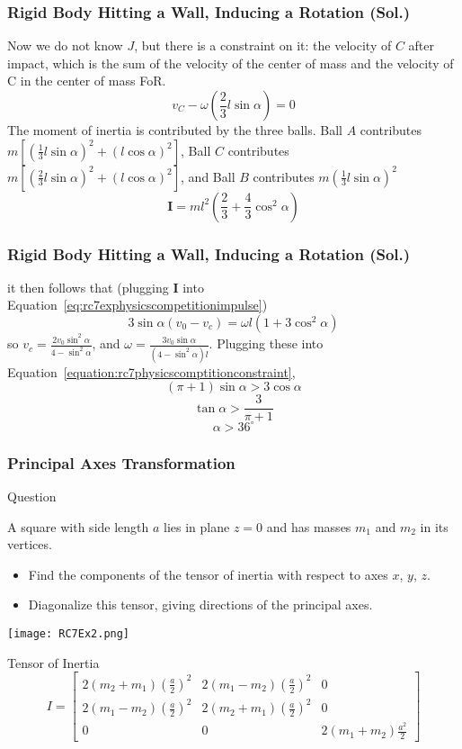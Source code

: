 \begin{frame}
\frametitle{Rigid Body Hitting a Wall, Inducing a Rotation (Sol.)}
Now we do not know $J$, but there is a constraint on it: the velocity of $C$ after impact, which is the sum of the velocity of the center of mass and the velocity of C in the center of mass FoR.
\[v_C-\omega(\frac{2}{3}l\sin\alpha)=0\]
The moment of inertia is contributed by the three balls. Ball $A$ contributes $m\left[\left(\frac{1}{3}l\sin\alpha\right)^2+\left(l\cos\alpha\right)^2\right]$, Ball $C$ contributes $m\left[\left(\frac{2}{3}l\sin\alpha\right)^2+\left(l\cos\alpha\right)^2\right]$, and Ball $B$ contributes $m\left(\frac{1}{3}l\sin\alpha\right)^2$
\[\mathbf{I}=ml^2(\frac{2}{3}+\frac{4}{3}\cos^2\alpha)\]

\end{frame}
\begin{frame}
\frametitle{Rigid Body Hitting a Wall, Inducing a Rotation (Sol.)}
it then follows that (plugging $\mathbf I$ into Equation~\ref{eq:rc7exphysicscompetitionimpulse}) \[3\sin\alpha (v_0-v_c)=\omega l(1+3\cos^2\alpha)\]
so $v_c=\frac{2v_0\sin^2\alpha}{4-\sin^2\alpha}$, and $\omega=\frac{3v_0\sin\alpha}{(4-\sin^2\alpha)l}$. Plugging these into Equation~\ref{equation:rc7physicscomptitionconstraint},
\[(\pi+1)\sin\alpha>3\cos\alpha\]
\[\tan\alpha>\frac{3}{\pi+1}\]
\[\alpha>36^\circ\]
\end{frame}
\begin{frame}
\frametitle{Principal Axes Transformation}
\begin{block}{Question}
\begin{multicols}{2}
A square with side length $a$ lies in plane $z=0$ and has masses $m_1$ and $m_2$ in its vertices.\begin{itemize}
\item Find the components of the tensor of inertia with respect to axes $x$, $y$, $z$.
\item Diagonalize this tensor, giving directions of the principal axes.
\end{itemize}
\texttt{[image: RC7Ex2.png]}
\end{multicols}
\end{block}
\begin{block}{Tensor of Inertia}
\[I=\left[\begin{matrix}
2(m_2+m_1)(\frac{a}{2})^2&2(m_1-m_2)(\frac{a}{2})^2&0\\
2(m_1-m_2)(\frac{a}{2})^2&2(m_2+m_1)(\frac{a}{2})^2&0\\
0&0&2(m_1+m_2)\frac{a^2}{2}
\end{matrix}\right]\]
\end{block}
\end{frame}

